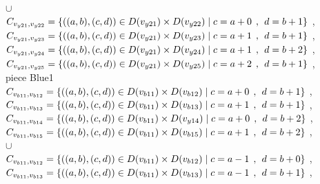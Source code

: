\\$\cup$
\\$C_{v_{y21},v_{y22}}=\{((a,b),(c,d))\in D(v_{y21}) \times D(v_{y22})\mid c = a + 0\hspace{1ex} , \hspace{1ex}  d = b + 1 \}$ , 
\\$C_{v_{y21},v_{y23}}=\{((a,b),(c,d))\in D(v_{y21}) \times D(v_{y23})\mid c = a + 1\hspace{1ex} , \hspace{1ex}  d = b + 1 \}$ , 
\\$C_{v_{y21},v_{y24}}=\{((a,b),(c,d))\in D(v_{y21}) \times D(v_{y24})\mid c = a + 1\hspace{1ex} , \hspace{1ex}  d = b + 2 \}$ , 
\\$C_{v_{y21},v_{y25}}=\{((a,b),(c,d))\in D(v_{y21}) \times D(v_{y25})\mid c = a + 2\hspace{1ex} , \hspace{1ex}  d = b + 1 \}$ , 
\\ piece Blue1 
\\$C_{v_{b11},v_{b12}}=\{((a,b),(c,d))\in D(v_{b11}) \times D(v_{b12})\mid c = a + 0\hspace{1ex} , \hspace{1ex}  d = b + 1 \}$ , 
\\$C_{v_{b11},v_{b13}}=\{((a,b),(c,d))\in D(v_{b11}) \times D(v_{b13})\mid c = a + 1\hspace{1ex} , \hspace{1ex}  d = b + 1 \}$ , 
\\$C_{v_{b11},v_{b14}}=\{((a,b),(c,d))\in D(v_{b11}) \times D(v_{y14})\mid c = a + 0\hspace{1ex} , \hspace{1ex}  d = b + 2 \}$ , 
\\$C_{v_{b11},v_{b15}}=\{((a,b),(c,d))\in D(v_{b11}) \times D(v_{b15})\mid c = a + 1\hspace{1ex} , \hspace{1ex}  d = b + 2 \}$ , 
\\$\cup$
\\$C_{v_{b11},v_{b12}}=\{((a,b),(c,d))\in D(v_{b11}) \times D(v_{b12})\mid c = a - 1\hspace{1ex} , \hspace{1ex}  d = b + 0 \}$ , 
\\$C_{v_{b11},v_{b13}}=\{((a,b),(c,d))\in D(v_{b11}) \times D(v_{b13})\mid c = a - 1\hspace{1ex} , \hspace{1ex}  d = b + 1 \}$ , 
